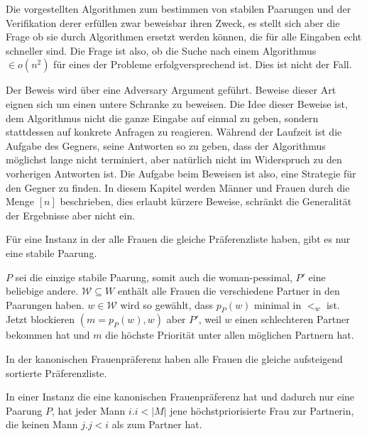 Die vorgestellten Algorithmen zum bestimmen von stabilen Paarungen und der Verifikation derer erfüllen zwar beweisbar ihren Zweck, es stellt sich aber die Frage ob sie durch Algorithmen ersetzt werden können, die für alle Eingaben echt schneller sind. Die Frage ist also, ob die Suche nach einem Algorithmus $\in o(n^2)$ für eines der Probleme erfolgversprechend ist. Dies ist nicht der Fall.\par

Der Beweis wird über eine Adversary Argument geführt. Beweise dieser Art eignen sich um einen untere Schranke zu beweisen. Die Idee dieser Beweise ist, dem Algorithmus nicht die ganze Eingabe auf einmal zu geben, sondern stattdessen auf konkrete Anfragen zu reagieren. Während der Laufzeit ist die Aufgabe des Gegners, seine Antworten so zu geben, dass der Algorithmus möglichst lange nicht terminiert, aber natürlich nicht im Widerspruch zu den vorherigen Antworten ist. Die Aufgabe beim Beweisen ist also, eine Strategie für den Gegner zu finden. In diesem Kapitel werden Männer und Frauen durch die Menge $[n]$ beschrieben, dies erlaubt kürzere Beweise, schränkt die Generalität der Ergebnisse aber nicht ein.\par

\begin{Lemma}
\label{eine_paarung}
  Für eine Instanz in der alle Frauen die gleiche Präferenzliste haben, gibt es nur eine stabile Paarung.
\end{Lemma}

\begin{Beweis}
\label{eine_paarung_bew}
  $P$ sei die einzige stabile Paarung, somit auch die woman-pessimal, $P'$ eine beliebige andere. $\mathcal{W} \subseteq W$ enthält alle Frauen die verschiedene Partner in den Paarungen haben. $w \in \mathcal{W}$ wird so gewählt, dass $p_{P}(w)$ minimal in $<_{w}$ ist. Jetzt blockieren $(m = p_{P}(w),w)$ aber $P'$, weil $w$ einen schlechteren Partner bekommen hat und $m$ die höchste Priorität unter allen möglichen Partnern hat.
\end{Beweis}

\begin{Definition}
\label{kanonische_listen}
  In der kanonischen Frauenpräferenz haben alle Frauen die gleiche aufsteigend sortierte Präferenzliste.
\end{Definition}

\begin{Lemma}
\label{beste_frau}
  In einer Instanz die eine kanonischen Frauenpräferenz hat und dadurch nur eine Paarung $P$, hat jeder Mann $i.i<|M|$ jene höchstpriorisierte Frau zur Partnerin, die keinen Mann $j.j<i$ als zum Partner hat.
\end{Lemma}

